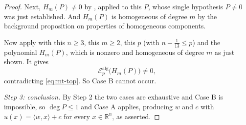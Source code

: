 \begin{proof}
Next, $H_m(P)\ne0$ by , applied to this $P$, whose
single hypothesis $P\ne0$ was just established. And $H_m(P)$ is homogeneous of
degree $m$ by the background proposition on properties of homogeneous
components.

Now apply  with this $n\ge3$, this $m\ge2$, this $p$
(with $n-\tfrac1{13}\le p$) and the polynomial $H_m(P)$, which is nonzero and
homogeneous of degree $m$ as just shown. It gives
\[
  \mathcal{E}^{\mathrm{alg}}_p\bigl(H_m(P)\bigr)\ne0 ,
\]
contradicting \eqref{eq:mt-top}. So Case B cannot occur.

\emph{Step 3: conclusion.} By Step 2 the two cases are exhaustive and Case B is
impossible, so $\deg P\le1$ and Case A applies, producing $w$ and $c$ with
$u(x)=\langle w,x\rangle+c$ for every $x\in\mathbb{R}^n$, as asserted.
\end{proof}

